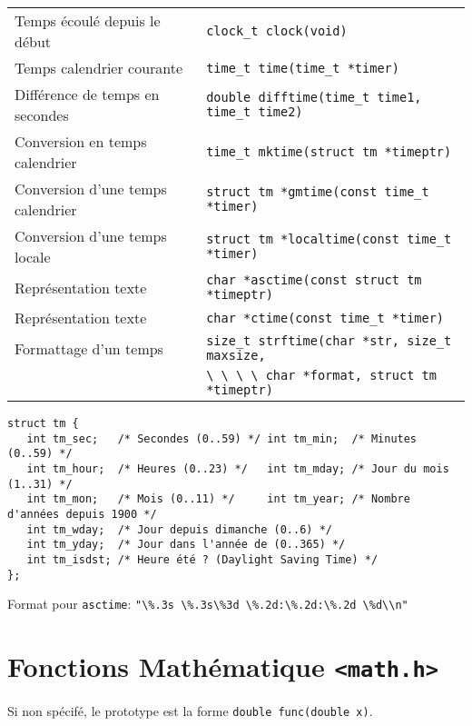 \documentclass{article}
\newcommand{\cd}{\lstinline}
\begin{document}
\begin{multicols*}{3}
\begin{tabularx}{\linewidth}{Xl}
  Temps écoulé depuis le début & \cd{clock_t clock(void)} \\
  Temps calendrier courante & \cd{time_t time(time_t *timer)} \\
  Différence de temps en secondes & \cd{double difftime(time_t time1, time_t time2)} \\
  Conversion en temps calendrier & \cd{time_t mktime(struct tm *timeptr)} \\
  Conversion d'une temps calendrier & \cd{struct tm *gmtime(const time_t *timer)} \\
  Conversion d'une temps locale & \cd{struct tm *localtime(const time_t *timer)} \\
  Représentation texte & \cd{char *asctime(const struct tm *timeptr)} \\
  Représentation texte & \cd{char *ctime(const time_t *timer)} \\
  Formattage d'un temps & \cd{size_t strftime(char *str, size_t maxsize,} \\
                     & \cd{\ \ \ \ char *format, struct tm *timeptr)} \\
\end{tabularx}

\begin{lstlisting}
struct tm {
   int tm_sec;   /* Secondes (0..59) */ int tm_min;  /* Minutes (0..59) */
   int tm_hour;  /* Heures (0..23) */   int tm_mday; /* Jour du mois (1..31) */
   int tm_mon;   /* Mois (0..11) */     int tm_year; /* Nombre d'années depuis 1900 */
   int tm_wday;  /* Jour depuis dimanche (0..6) */
   int tm_yday;  /* Jour dans l'année de (0..365) */
   int tm_isdst; /* Heure été ? (Daylight Saving Time) */
};
\end{lstlisting}

Format pour \texttt{asctime}: \cd{"\%.3s \%.3s\%3d \%.2d:\%.2d:\%.2d \%d\\n"}

\section*{Fonctions Mathématique \texttt{<math.h>}}

Si non spécifé, le prototype est la forme \cd{double func(double x)}.


\end{multicols*}
\end{document}

